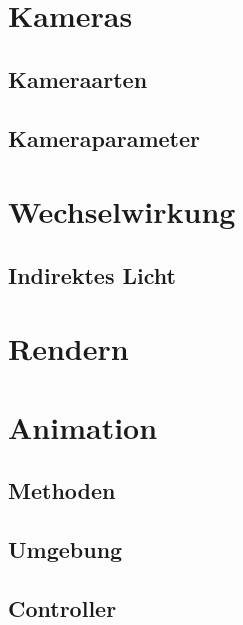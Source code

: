 
\section{Kameras}
\subsection{Kameraarten}
\subsection{Kameraparameter}

\section{Wechselwirkung}
\subsection{Indirektes Licht}

\section{Rendern}

\section{Animation}
\subsection{Methoden}
\subsection{Umgebung}
\subsection{Controller}
